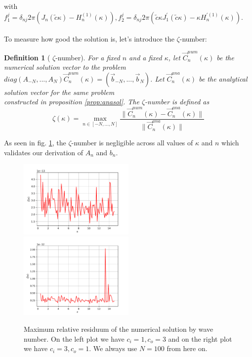 \documentclass[10pt,journal,compsoc, onecolumn]{IEEEtran}
\newtheorem{definition}[theorem]{Definition}
\begin{document}
with $f_1^j =  \delta_{nj} 2\pi (J_n(\tilde c \kappa) - H_n^{(1)}(\kappa)), f_2^j = \delta_{nj} 2\pi (\tilde c \kappa J_1^{\prime}(\tilde c\kappa) - \kappa H_n^{\prime(1)}(\kappa))$.\\
\\
To measure how good the solution is, let's introduce the $\zeta$-number: 
\begin{definition}[ $\zeta$-number]
    For a fixed $n$ and a fixed $\kappa$, let $\vec{C}^{num}_n(\kappa)$ be the numerical solution vector to the problem \\
    $diag(A_{-N}, ..., A_N) \vec{C}^{num}_n(\kappa) = (\vec{b}_{-N}, ... , \vec{b}_{N})$. 
    Let $\vec{C}^{ana}_n(\kappa)$ be the analytical solution vector for the same problem \\
    constructed in proposition \ref{prop:anasol}.
    The $\zeta$-number is defined as 
    $$
        \zeta(\kappa)=  \max\limits_{n \in [-N, ..., N]}\frac{\|\vec{C}^{num}_n(\kappa) - \vec{C}^{ana}_n(\kappa)\|}{\|\vec{C}^{ana}_n(\kappa)\|}
    $$ 
\end{definition}
As seen in fig. \ref{fig:sol_validation}, the $\zeta$-number is negligible across all values of $\kappa$ and $n$ which validates our derivation of $A_n$ and $b_n$.
\begin{figure}
    \includegraphics[width=0.5\textwidth]{scenario1SolVal.pdf}
    \includegraphics[width=0.5\textwidth]{scenario2SolVal.pdf}
    \caption{Maximum relative residuum of the numerical solution by wave number. 
    On the left plot we have $c_i = 1, c_o = 3$ 
    and on the right plot we have $c_i = 3, c_o = 1.$
    We always use $N = 100$ from here on.}
    \label{fig:sol_validation}
\end{figure}
\end{document}
